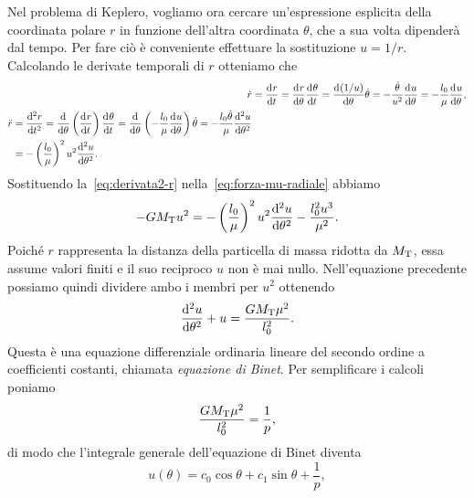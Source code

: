 Nel problema di Keplero, vogliamo ora cercare un'espressione esplicita della
coordinata polare $r$ in funzione dell'altra coordinata $\theta$, che a sua
volta dipenderà dal tempo. Per fare ciò è conveniente effettuare la sostituzione
$u=1/r$. Calcolando le derivate temporali di $r$ otteniamo che
\begin{subequations}
  \begin{align}
    \dot{r} &= \toder{r}{t} = \toder{r}{\theta}\toder{\theta}{t} =
    \toder{(1/u)}{\theta}\dot{\theta} =
    -\frac{\dot{\theta}}{u^2}\toder{u}{\theta}
    = -\frac{l_0}{\mu}\toder{u}{\theta}, \label{eq:derivata1-r}\\
    \begin{split}
      \ddot{r} &= \toder[2]{r}{t} = \toder{}{\theta} \left( \toder{r}{t}
      \right)\toder{\theta}{t} = \toder{}{\theta} \left(
        -\frac{l_0}{\mu}\toder{u}{\theta} \right)\dot{\theta} =
      -\frac{l_0\dot{\theta}}{\mu}\toder[2]{u}{\theta} \\
      &= - \left(
        \frac{l_0}{\mu} \right)^2u^2\toder[2]{u}{\theta}. \label{eq:derivata2-r}
    \end{split}
  \end{align}
\end{subequations}
Sostituendo la~\eqref{eq:derivata2-r} nella~\eqref{eq:forza-mu-radiale} abbiamo
\begin{equation}
  -GM_\textup{T}u^2 = -
  \left(
    \frac{l_0}{\mu}
  \right)^2u^2\toder[2]{u}{\theta} - \frac{l_0^2u^3}{\mu^2}.
\end{equation}
Poiché $r$ rappresenta la distanza della particella di massa ridotta da
$M_\textup{T}$, essa assume valori finiti e il suo reciproco $u$ non è mai
nullo. Nell'equazione precedente possiamo quindi dividere ambo i membri per
$u^2$ ottenendo
\begin{equation}
  \toder[2]{u}{\theta} + u = \frac{GM_\textup{T}\mu^2}{l_0^2}.
\end{equation}
Questa è una equazione differenziale ordinaria lineare del secondo ordine a
coefficienti costanti, chiamata \emph{equazione di Binet}. Per semplificare i
calcoli poniamo
\begin{equation}
  \label{eq:reciproco-semilato}
  \frac{GM_\textup{T}\mu^2}{l_0^2} = \frac{1}{p},
\end{equation}
di modo che l'integrale generale dell'equazione di Binet diventa
\begin{equation}
  \label{eq:soluzione-binet}
  u(\theta) = c_0\cos\theta + c_1\sin\theta + \frac{1}{p},
\end{equation}
